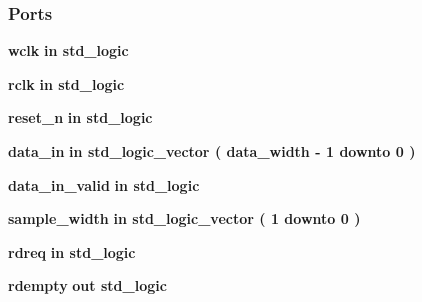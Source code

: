 \subsubsection*{Ports}
 \begin{DoxyCompactItemize}
\item 
{\bf wclk}  {\bfseries {\bfseries \textcolor{keywordflow}{in}\textcolor{vhdlchar}{ }}} {\bfseries \textcolor{comment}{std\+\_\+logic}\textcolor{vhdlchar}{ }} 
\item 
{\bf rclk}  {\bfseries {\bfseries \textcolor{keywordflow}{in}\textcolor{vhdlchar}{ }}} {\bfseries \textcolor{comment}{std\+\_\+logic}\textcolor{vhdlchar}{ }} 
\item 
{\bf reset\+\_\+n}  {\bfseries {\bfseries \textcolor{keywordflow}{in}\textcolor{vhdlchar}{ }}} {\bfseries \textcolor{comment}{std\+\_\+logic}\textcolor{vhdlchar}{ }} 
\item 
{\bf data\+\_\+in}  {\bfseries {\bfseries \textcolor{keywordflow}{in}\textcolor{vhdlchar}{ }}} {\bfseries \textcolor{comment}{std\+\_\+logic\+\_\+vector}\textcolor{vhdlchar}{ }\textcolor{vhdlchar}{(}\textcolor{vhdlchar}{ }\textcolor{vhdlchar}{ }\textcolor{vhdlchar}{ }\textcolor{vhdlchar}{ }{\bfseries {\bf data\+\_\+width}} \textcolor{vhdlchar}{-\/}\textcolor{vhdlchar}{ } \textcolor{vhdldigit}{1} \textcolor{vhdlchar}{ }\textcolor{keywordflow}{downto}\textcolor{vhdlchar}{ }\textcolor{vhdlchar}{ } \textcolor{vhdldigit}{0} \textcolor{vhdlchar}{ }\textcolor{vhdlchar}{)}\textcolor{vhdlchar}{ }} 
\item 
{\bf data\+\_\+in\+\_\+valid}  {\bfseries {\bfseries \textcolor{keywordflow}{in}\textcolor{vhdlchar}{ }}} {\bfseries \textcolor{comment}{std\+\_\+logic}\textcolor{vhdlchar}{ }} 
\item 
{\bf sample\+\_\+width}  {\bfseries {\bfseries \textcolor{keywordflow}{in}\textcolor{vhdlchar}{ }}} {\bfseries \textcolor{comment}{std\+\_\+logic\+\_\+vector}\textcolor{vhdlchar}{ }\textcolor{vhdlchar}{(}\textcolor{vhdlchar}{ }\textcolor{vhdlchar}{ } \textcolor{vhdldigit}{1} \textcolor{vhdlchar}{ }\textcolor{keywordflow}{downto}\textcolor{vhdlchar}{ }\textcolor{vhdlchar}{ } \textcolor{vhdldigit}{0} \textcolor{vhdlchar}{ }\textcolor{vhdlchar}{)}\textcolor{vhdlchar}{ }} 
\item 
{\bf rdreq}  {\bfseries {\bfseries \textcolor{keywordflow}{in}\textcolor{vhdlchar}{ }}} {\bfseries \textcolor{comment}{std\+\_\+logic}\textcolor{vhdlchar}{ }} 
\item 
{\bf rdempty}  {\bfseries {\bfseries \textcolor{keywordflow}{out}\textcolor{vhdlchar}{ }}} {\bfseries \textcolor{comment}{std\+\_\+logic}\textcolor{vhdlchar}{ }} 

\end{DoxyCompactItemize}
